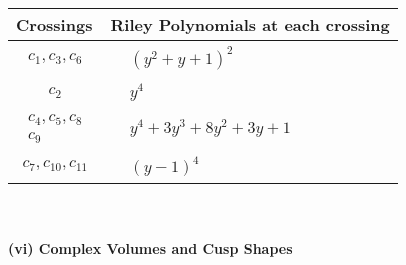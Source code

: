 \documentclass[1p]{elsarticle_modified}
\theoremstyle{definition}
\begin{document}
\begin{tabular}{m{50pt}|m{274pt}}
Crossings & \hspace{64pt}Riley Polynomials at each crossing \\
\hline $$\begin{aligned}c_{1},c_{3},c_{6}\end{aligned}$$&$\begin{aligned}
&(y^2+y+1)^2
\end{aligned}$\\
\hline $$\begin{aligned}c_{2}\end{aligned}$$&$\begin{aligned}
&y^4
\end{aligned}$\\
\hline $$\begin{aligned}c_{4},c_{5},c_{8}\\c_{9}\end{aligned}$$&$\begin{aligned}
&y^4+3 y^3+8 y^2+3 y+1
\end{aligned}$\\
\hline $$\begin{aligned}c_{7},c_{10},c_{11}\end{aligned}$$&$\begin{aligned}
&(y-1)^4
\end{aligned}$\\
\hline
\end{tabular}\\~\\
\newpage\flushleft \textbf{(vi) Complex Volumes and Cusp Shapes}
\end{document}
